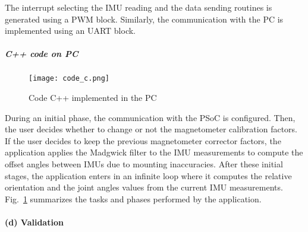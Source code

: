 \begin{enumerate}
The interrupt selecting the IMU reading and the data sending routines is generated using a PWM block. Similarly, the communication with the PC is implemented using an UART block.%



\end{enumerate}

\subparagraph{C++ code on PC}


\begin{figure}[h]
\centering
\texttt{[image: code\_c.png]}
\caption{Code C++ implemented in the PC}
\label{fig:code_c}
\end{figure}

During an initial phase, the communication with the PSoC is configured. Then, the user decides whether to change or not the magnetometer calibration factors. 
If the user decides to keep the previous magnetometer corrector factors, the application applies the Madgwick filter to the IMU measurements to compute the offset angles between IMUs due to mounting inaccuracies. After these initial stages, the application enters in an infinite loop where it computes the relative orientation and the joint angles values from the current IMU measurements. Fig.~\ref{fig:code_c} summarizes the tasks and phases performed by the application.


\paragraph{(d) Validation}

